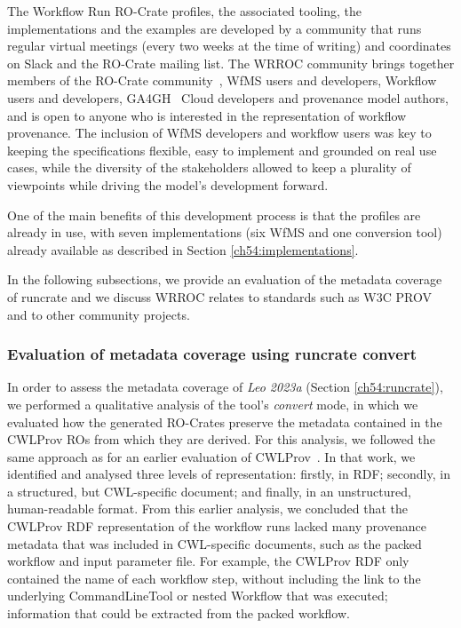 The Workflow Run RO-Crate profiles, the associated tooling, the implementations and the examples are developed by a community that runs regular virtual meetings (every two weeks at the time of writing) and coordinates on Slack and the RO-Crate mailing list.
The \acrshort{WRROC} community brings together members of the RO-Crate community~\cite{Soiland-Reyes 2022a}, \acrshort{WfMS} users and developers, Workflow users and developers, GA4GH~\cite{Rehm 2021} Cloud developers and provenance model authors, and is open to anyone who is interested in the representation of workflow provenance.
The inclusion of WfMS developers and workflow users was key to keeping the specifications flexible, easy to implement and grounded on real use cases, while the diversity of the stakeholders allowed to keep a plurality of viewpoints while driving the model's development forward.

One of the main benefits of this development process is that the profiles are already in use, with seven implementations (six WfMS and one conversion tool) already available as described in Section \vref{ch54:implementations}.

In the following subsections, we provide an evaluation of the metadata coverage of runcrate and we discuss WRROC relates to standards such as W3C PROV and to other community projects.


\subsubsection{Evaluation of metadata coverage using runcrate convert}

In order to assess the metadata coverage of \emph{Leo 2023a} (Section \vref{ch54:runcrate}), we performed a qualitative analysis of the tool's \emph{convert} mode, in which we evaluated how the generated RO-Crates preserve the metadata contained in the CWLProv ROs from which they are derived.
For this analysis, we followed the same approach as for an earlier evaluation of CWLProv~\cite{de Wit 2022}.
In that work, we identified and analysed three levels of representation:
firstly, in RDF; secondly, in a structured, but CWL-specific document;
and finally, in an unstructured, human-readable format.
From this earlier analysis, we concluded that the CWLProv RDF representation of the workflow runs lacked many provenance metadata that was included in CWL-specific documents, such as the packed workflow and input parameter file.
For example, the CWLProv RDF only contained the name of each workflow step, without including the link to the underlying CommandLineTool or nested Workflow that was executed; information that could be extracted from the packed workflow.


